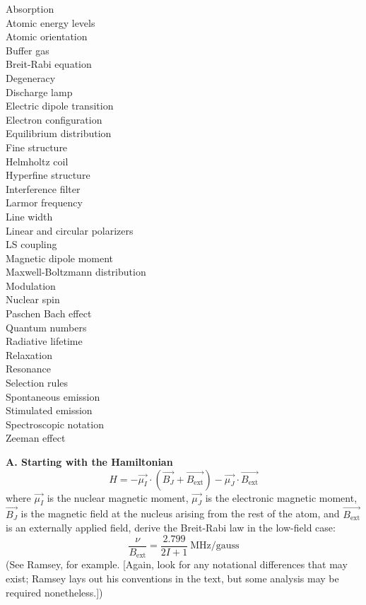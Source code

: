 \documentclass{../lab}
\begin{document}
\begin{multicols}{3}
\noindent
Absorption \\
Atomic energy levels \\
Atomic orientation \\
Buffer gas \\
Breit-Rabi equation \\
Degeneracy \\
Discharge lamp \\
Electric dipole transition \\
Electron configuration \\
Equilibrium distribution \\
Fine structure \\
Helmholtz coil \\
Hyperfine structure \\
Interference filter \\
Larmor frequency \\
Line width \\
Linear and circular polarizers \\
LS coupling \\
Magnetic dipole moment \\
Maxwell-Boltzmann distribution \\
Modulation \\
Nuclear spin \\
Paschen Bach effect \\
Quantum numbers \\
Radiative lifetime \\
Relaxation \\
Resonance \\
Selection rules \\
Spontaneous emission \\
Stimulated emission \\
Spectroscopic notation \\
Zeeman effect
\end{multicols}

\noindent\textbf{A. Starting with the Hamiltonian}
\begin{equation}
    H = -\vec{\mu_I} \cdot \left(\overrightarrow{B_J} + \overrightarrow{B_\textrm{ext}}\right) - \vec{\mu_J} \cdot \overrightarrow{B_\textrm{ext}}
\end{equation}
where $\vec{\mu_I}$ is the nuclear magnetic moment, $\vec{\mu_J}$ is the electronic magnetic moment, $\overrightarrow{B_J}$ is the magnetic field at the nucleus arising from the rest of the atom, and $\overrightarrow{B_\textrm{ext}}$ is an externally applied field, derive the Breit-Rabi law in the low-field case:
\begin{equation}\label{eq:BreitRabi}
    \frac{\nu}{B_\textrm{ext}} = \frac{2.799}{2I + 1} ~\textrm{MHz/gauss}
\end{equation}
(See Ramsey, for example. [Again, look for any notational differences that may exist; Ramsey lays out his conventions in the text, but some analysis may be required nonetheless.]) \\
\end{document}
